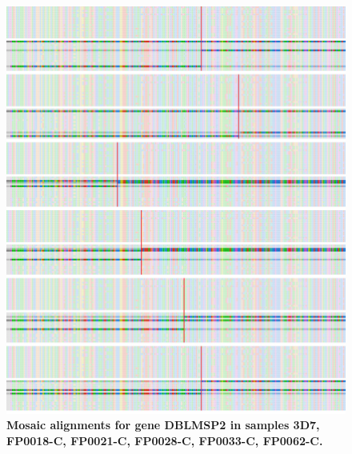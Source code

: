 \documentclass[12pt]{article}
\begin{document}
\begin{figure}
    \centering
    \centerline{\includegraphics[width=1.2\textwidth]{DBLMSP2_ref_FP0018-C_FP0021-C_FP0028-C_FP0033-C_FP0062-C.png}}
    \caption[Mosaic alignments (5)]{
        \textbf{Mosaic alignments for gene DBLMSP2 in samples 3D7, FP0018-C, FP0021-C,
        FP0028-C, FP0033-C, FP0062-C.}
        }
    \label{pa:fig:mosaic_app5}
\end{figure}
\end{document}
